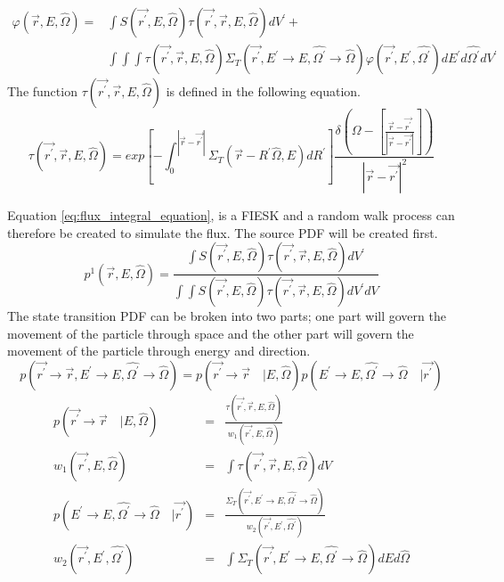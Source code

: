 \begin{equation}
  \begin{split}
    \varphi(\vec{r},E,\hat{\Omega}) = & \int S(\vec{r^{'}},E,\hat{\Omega})
    \tau(\vec{r^{'}},\vec{r},E,\hat{\Omega}) dV^{'} + \\
    & \int\int\int \tau(\vec{r^{'}},\vec{r},E,\hat{\Omega})
    \Sigma_T(\vec{r^{'}},E^{'} \to E, \hat{\Omega^{'}} \to \hat{\Omega})
    \varphi(\vec{r^{'}},E^{'},\hat{\Omega^{'}}) dE^{'} d\hat{\Omega^{'}} dV^{'}
  \end{split}
  \label{eq:flux_integral_equation}
\end{equation}
The function $\tau(\vec{r^{'}},\vec{r},E,\hat{\Omega})$ is defined in the following 
equation.
\begin{equation}
  \tau(\vec{r^{'}},\vec{r},E,\hat{\Omega}) = 
  exp\left[-\int_0^{|\vec{r} - \vec{r^{'}}|} 
              \Sigma_T(\vec{r}-R^{'}\hat{\Omega},E)dR^{'} \right]
    \frac{\delta \left(\Omega - \left[\frac{\vec{r} - \vec{r^{'}}}
        {|\vec{r} - \vec{r^{'}}|}\right]\right)} 
    {|\vec{r} - \vec{r^{'}}|^2}
  \label{eq:unnormalized_transport_kernel}
\end{equation}

Equation \ref{eq:flux_integral_equation}, is a FIESK and a random walk process 
can therefore be created to simulate the flux. The source PDF will be created 
first. 
\begin{equation}
  p^1(\vec{r},E,\hat{\Omega}) = \frac{\int S(\vec{r^{'}},E,\hat{\Omega})
    \tau(\vec{r^{'}},\vec{r},E,\hat{\Omega}) dV^{'}}{\int\int S(\vec{r^{'}},E,\hat{\Omega})
    \tau(\vec{r^{'}},\vec{r},E,\hat{\Omega}) dV^{'} dV}
\end{equation}
The state transition PDF can be broken into two parts; one part will govern the
movement of the particle through space and the other part will govern the 
movement of the particle through energy and direction.
\begin{equation*}
  p(\vec{r^{'}} \to \vec{r}, E^{'} \to E, \hat{\Omega^{'}} \to \hat{\Omega}) = 
  p(\vec{r^{'}} \to \vec{r}\quad| E,\hat{\Omega})
  p(E^{'} \to E, \hat{\Omega^{'}} \to \hat{\Omega}\quad|\vec{r^{'}})
\end{equation*}
\begin{eqnarray}
  p(\vec{r^{'}} \to \vec{r}\quad | E,\hat{\Omega}) & = & 
  \frac{\tau(\vec{r^{'}},\vec{r},E,\hat{\Omega})}{w_1(\vec{r^{'}},E,\hat{\Omega})}  \\
  w_1(\vec{r^{'}},E,\hat{\Omega}) & = & \int \tau(\vec{r^{'}},\vec{r},E,\hat{\Omega}) dV \\
  p(E^{'} \to E, \hat{\Omega^{'}} \to \hat{\Omega}\quad|\vec{r^{'}}) & = &
  \frac{\Sigma_T(\vec{r^{'}},E^{'} \to E, \hat{\Omega^{'}} \to \hat{\Omega})}
       {w_2(\vec{r^{'}},E^{'},\hat{\Omega^{'}})} \\
  w_2(\vec{r^{'}},E^{'},\hat{\Omega^{'}}) & = & \int 
  \Sigma_T(\vec{r^{'}},E^{'} \to E, \hat{\Omega^{'}} \to \hat{\Omega}) 
  dE d\hat{\Omega}
\end{eqnarray}

